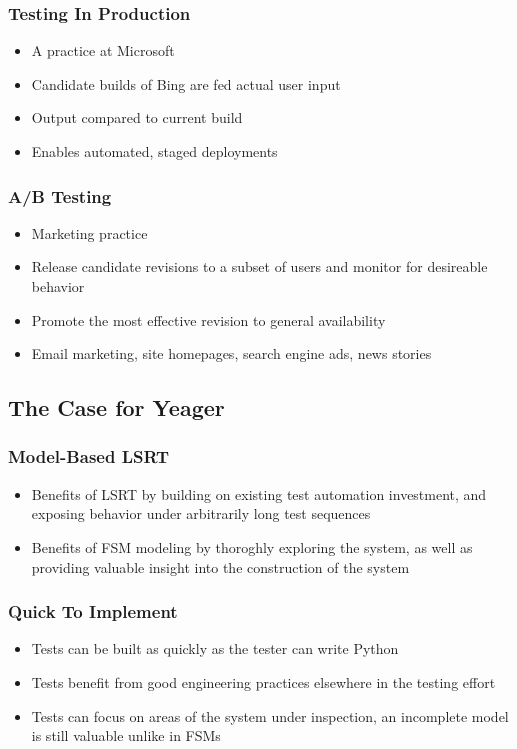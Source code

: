 \begin{frame}
  \frametitle{Testing In Production}
  \begin{itemize}
    \item A practice at Microsoft
    \item Candidate builds of Bing are fed actual user input
    \item Output compared to current build
    \item Enables automated, staged deployments
  \end{itemize}
\end{frame}

\begin{frame}
  \frametitle{A/B Testing}
  \begin{itemize}
    \item Marketing practice
    \item Release candidate revisions to a subset of users and monitor for desireable behavior
    \item Promote the most effective revision to general availability
    \item Email marketing, site homepages, search engine ads, news stories
  \end{itemize}\cite{HBR2017ABTest}
\end{frame}

\subsection{The Case for Yeager}

\begin{frame}
  \frametitle{Model-Based LSRT}
  \begin{itemize}
    \item Benefits of LSRT by building on existing test automation investment, and exposing behavior under arbitrarily long test sequences
    \item Benefits of FSM modeling by thoroghly exploring the system, as well as providing valuable insight into the construction of the system
  \end{itemize}
\end{frame}

\begin{frame}
  \frametitle{Quick To Implement}
  \begin{itemize}
    \item Tests can be built as quickly as the tester can write Python
    \item Tests benefit from good engineering practices elsewhere in the testing effort
    \item Tests can focus on areas of the system under inspection, an incomplete model is still valuable unlike in FSMs
  \end{itemize}
\end{frame}

